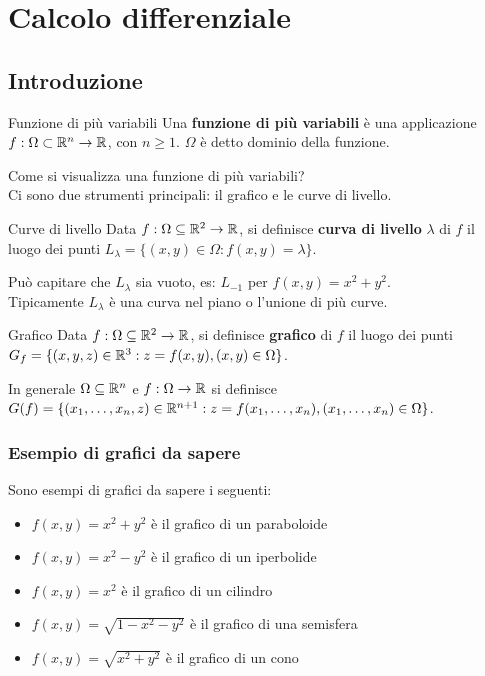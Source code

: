 \chapter{Calcolo differenziale}

\section{Introduzione}
\begin{definizione}{Funzione di più variabili}
  Una \textbf{funzione di più variabili} è una applicazione $f:\Omega \subset \mathbb{R}^n \rightarrow \mathbb{R}$, con $n\geq 1$. $\Omega$ è detto dominio della funzione.
  \end{definizione}

Come si visualizza una funzione di più variabili?\\
Ci sono due strumenti principali: il grafico e le curve di livello.\\

\begin{definizione}{Curve di livello}
Data $f:\Omega \subseteq \mathbb{R}^2 \rightarrow \mathbb{R}$, si definisce \textbf{curva di livello} $\lambda$ di $f$ il luogo dei punti $L_\lambda=\{(x,y)\in \Omega : f(x,y)=\lambda\}$.\\
\end{definizione}
Può capitare che $L_\lambda$ sia vuoto, es: $L_{-1}$ per $f(x,y)= x^2+y^2$.\\
Tipicamente $L_\lambda$ è una curva nel piano o l'unione di più curve.\\


\begin{definizione}{Grafico}
Data $f:\Omega \subseteq \mathbb{R}^2 \rightarrow \mathbb{R}$, si definisce \textbf{grafico} di $f$ il luogo dei punti $G_f=\{(x,y,z)\in \mathbb{R}^3 : z=f(x,y), (x,y)\in \Omega\}$.\\
\end{definizione}
In generale $\Omega \subseteq \mathbb{R}^n$ e $f:\Omega \rightarrow \mathbb{R}$ si definisce $G(f)=\{(x_1, \dots, x_n, z)\in \mathbb{R}^{n+1} : z=f(x_1, \dots, x_n), (x_1, \dots, x_n)\in \Omega\}$.\\

\subsection{Esempio di grafici da sapere}
Sono esempi di grafici da sapere i seguenti:
\begin{itemize}
  \item $f(x,y)=x^2+y^2$ è il grafico di un paraboloide
  \item $f(x,y)=x^2-y^2$ è il grafico di un iperbolide
  \item $f(x,y)=x^2$ è il grafico di un cilindro
  \item $f(x,y)=\sqrt{1-x^2-y^2}$ è il grafico di una semisfera
  \item $f(x,y)=\sqrt{x^2+y^2}$ è il grafico di un cono
\end{itemize}


